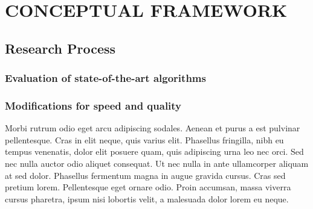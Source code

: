 
\chapter{CONCEPTUAL FRAMEWORK} %

\label{Chapter3} %



\section{Research Process}




\subsection{Evaluation of state-of-the-art algorithms}



\subsection{Modifications for speed and quality}
Morbi rutrum odio eget arcu adipiscing sodales. Aenean et purus a est pulvinar pellentesque. Cras in elit neque, quis varius elit. Phasellus fringilla, nibh eu tempus venenatis, dolor elit posuere quam, quis adipiscing urna leo nec orci. Sed nec nulla auctor odio aliquet consequat. Ut nec nulla in ante ullamcorper aliquam at sed dolor. Phasellus fermentum magna in augue gravida cursus. Cras sed pretium lorem. Pellentesque eget ornare odio. Proin accumsan, massa viverra cursus pharetra, ipsum nisi lobortis velit, a malesuada dolor lorem eu neque.

